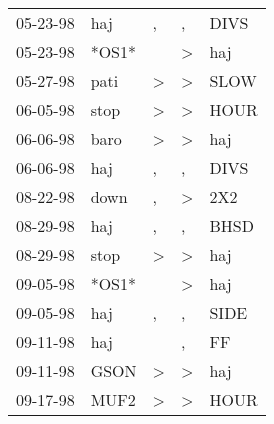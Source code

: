 \begin{supertabular}{p{0.07\textwidth}p{0.06\textwidth}p{0.02\textwidth}p{0.02\textwidth}p{0.06\textwidth}}
          05-23-98\textsuperscript{} &            haj\textsuperscript{} &                , &                , &           DIVS\textsuperscript{} \\
          05-23-98\textsuperscript{} &                            *OS1* &                  &     \textgreater &            haj\textsuperscript{} \\
          05-27-98\textsuperscript{} &           pati\textsuperscript{} &     \textgreater &     \textgreater &           SLOW\textsuperscript{} \\
          06-05-98\textsuperscript{} &           stop\textsuperscript{} &     \textgreater &     \textgreater &           HOUR\textsuperscript{} \\
          06-06-98\textsuperscript{} &           baro\textsuperscript{} &     \textgreater &     \textgreater &            haj\textsuperscript{} \\
          06-06-98\textsuperscript{} &            haj\textsuperscript{} &                , &                , &           DIVS\textsuperscript{} \\
          08-22-98\textsuperscript{} &           down\textsuperscript{} &                , &     \textgreater &            2X2\textsuperscript{} \\
          08-29-98\textsuperscript{} &            haj\textsuperscript{} &                , &                , &           BHSD\textsuperscript{} \\
          08-29-98\textsuperscript{} &           stop\textsuperscript{} &     \textgreater &     \textgreater &            haj\textsuperscript{} \\
          09-05-98\textsuperscript{} &                            *OS1* &                  &     \textgreater &            haj\textsuperscript{} \\
          09-05-98\textsuperscript{} &            haj\textsuperscript{} &                , &                , &           SIDE\textsuperscript{} \\
          09-11-98\textsuperscript{} &            haj\textsuperscript{} &                  &                , &             FF\textsuperscript{} \\
          09-11-98\textsuperscript{} &           GSON\textsuperscript{} &     \textgreater &     \textgreater &            haj\textsuperscript{} \\
          09-17-98\textsuperscript{} &           MUF2\textsuperscript{} &     \textgreater &     \textgreater &           HOUR\textsuperscript{} \\

\end{supertabular}
